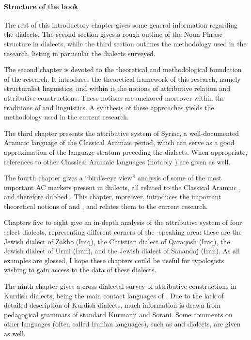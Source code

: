 \paragraph*{Structure of the book}

The rest of this introductory chapter gives some general information regarding the  dialects. The second section gives a rough outline of the Noun Phrase structure in  dialects, while the third section outlines the methodology used in the research, listing in particular the dialects surveyed.

The second chapter is devoted to the theoretical and methodological foundation of the research. It introduces the theoretical framework of this research, namely structuralist linguistics, and within it the notions of {attributive relation} and {attributive constructions}. These notions are anchored moreover within the traditions of  and  linguistics. A synthesis of these approaches yields the methodology used in the current research.

The third chapter presents the attributive system of Syriac, a well-documented Aramaic language of the {Classical Aramaic} period, which can serve as a good approximation of the language stratum preceding the  dialects. When appropriate, references to other {Classical Aramaic} languages (notably \JBA) are given as well. 

The fourth chapter gives a \enquote{bird's-eye view} analysis of some of the most important AC markers present in  dialects, all related to the {Classical Aramaic} \lnk* \d, and therefore dubbed . This chapter, moreover, introduces the important theoretical notions of  and , and relates them to the current research.

Chapters five to eight give an in-depth analysis of the attributive system of four select  dialects, representing different corners of the -speaking area: 
these are the Jewish dialect of Zakho (Iraq), the Christian dialect of Qaraqosh (Iraq), the Jewish dialect of Urmi (Iran), and the Jewish dialect of Sanandaj (Iran). As all examples are glossed, I hope these chapters could be useful for typologists wishing to gain access to the data of these dialects. 

The ninth chapter gives a cross-dialectal survey of attributive constructions in Kurdish dialects, being the main contact languages of . Due to the lack of detailed description of Kurdish dialects, much information is drawn from pedagogical grammars of standard Kurmanji and Sorani. Some comments on other  languages (often called Iranian languages), such as  and  dialects, are given as well.

